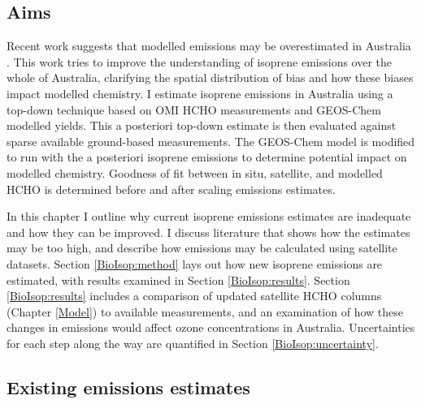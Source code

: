   \subsection{Aims}
    \label{BioIsop:intro:aims}
    
    Recent work suggests that modelled emissions may be overestimated in Australia \parencite{Emmerson2016}.
    This work tries to improve the understanding of isoprene emissions over the whole of Australia, clarifying the spatial distribution of bias and how these biases impact modelled chemistry.
    I estimate isoprene emissions in Australia using a top-down technique based on OMI HCHO measurements and GEOS-Chem modelled yields.
    This a posteriori top-down estimate is then evaluated against sparse available ground-based measurements.
    The GEOS-Chem model is modified to run with the a posteriori isoprene emissions to determine potential impact on modelled chemistry.
    Goodness of fit between in situ, satellite, and modelled HCHO is determined before and after scaling emissions estimates.
    
    
    In this chapter I outline why current isoprene emissions estimates are inadequate and how they can be improved.
    I discuss literature that shows how the estimates may be too high, and describe how emissions may be calculated using satellite datasets.
    Section \ref{BioIsop:method} lays out how new isoprene emissions are estimated, with results examined in Section \ref{BioIsop:results}. 
    Section \ref{BioIsop:results} includes a comparison of updated satellite HCHO columns (Chapter \ref{Model}) to available measurements, and an examination of how these changes in emissions would affect ozone concentrations in Australia.
    Uncertainties for each step along the way are quantified in Section \ref{BioIsop:uncertainty}.
    
    
  \subsection{Existing emissions estimates}
    

